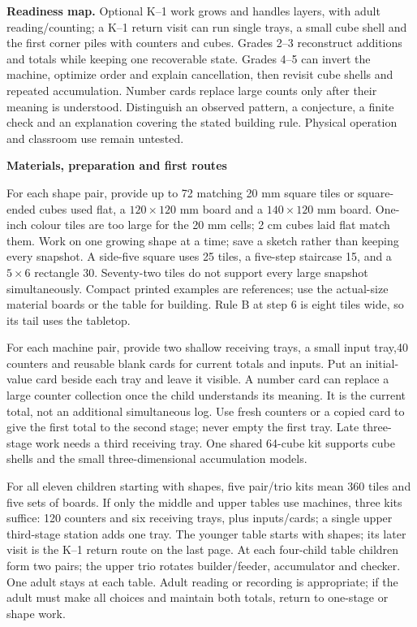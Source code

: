 \documentclass[11pt]{article}
\newcommand{\heading}[1]{\par\textbf{#1}\par}
\begin{document}
\textbf{Readiness map.} Optional K--1 work grows and handles layers, with adult reading/counting; a K--1 return visit can run single trays, a small cube shell and the first corner piles with counters and cubes. Grades 2--3 reconstruct additions and totals while keeping one recoverable state. Grades 4--5 can invert the machine, optimize order and explain cancellation, then revisit cube shells and repeated accumulation. Number cards replace large counts only after their meaning is understood. Distinguish an observed pattern, a conjecture, a finite check and an explanation covering the stated building rule. Physical operation and classroom use remain untested.
\newpage
\heading{Materials, preparation and first routes}
For each shape pair, provide up to 72 matching 20 mm square tiles or square-ended cubes used flat, a $120\times 120$ mm board and a $140\times 120$ mm board. One-inch colour tiles are too large for the 20 mm cells; 2 cm cubes laid flat match them. Work on one growing shape at a time; save a sketch rather than keeping every snapshot. A side-five square uses 25 tiles, a five-step staircase 15, and a $5\times 6$ rectangle 30. Seventy-two tiles do not support every large snapshot simultaneously. Compact printed examples are references; use the actual-size material boards or the table for building. Rule B at step 6 is eight tiles wide, so its tail uses the tabletop.

For each machine pair, provide two shallow receiving trays, a small input tray,40 counters and reusable blank cards for current totals and inputs. Put an initial-value card beside each tray and leave it visible. A number card can replace a large counter collection once the child understands its meaning. It is the current total, not an additional simultaneous log. Use fresh counters or a copied card to give the first total to the second stage; never empty the first tray. Late three-stage work needs a third receiving tray. One shared 64-cube kit supports cube shells and the small three-dimensional accumulation models.

For all eleven children starting with shapes, five pair/trio kits mean 360 tiles and five sets of boards. If only the middle and upper tables use machines, three kits suffice: 120 counters and six receiving trays, plus inputs/cards; a single upper third-stage station adds one tray. The younger table starts with shapes; its later visit is the K--1 return route on the last page. At each four-child table children form two pairs; the upper trio rotates builder/feeder, accumulator and checker. One adult stays at each table. Adult reading or recording is appropriate; if the adult must make all choices and maintain both totals, return to one-stage or shape work.
\end{document}
